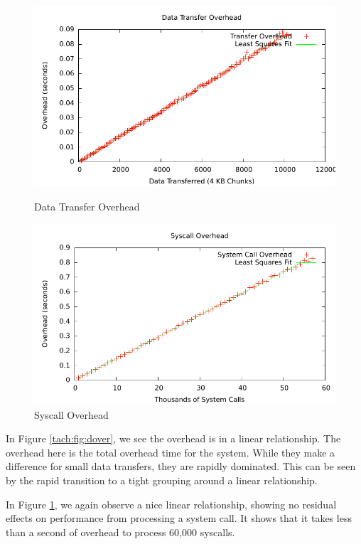 \begin{figure}
\begin{minipage}[b]{0.49\linewidth}
\centering
\includegraphics[scale=0.6, trim=40mm 0mm 20mm  0mm]{tachyon/dataData.pdf}
\caption{Data Transfer Overhead}
\label{tach:fig:dover}
\end{minipage}\begin{minipage}[b]{0.49\linewidth}
\centering
\includegraphics[scale=0.6]{tachyon/sysData.pdf}
\caption{Syscall Overhead}
\label{tach:fig:sover}
\end{minipage}
\end{figure}

In Figure \ref{tach:fig:dover}, we see the overhead is in a linear relationship.
The overhead here is the total overhead
time for the system. While they make a difference for small data transfers, they are
rapidly dominated. This can be seen by the rapid transition to a tight grouping
around a linear relationship.


In Figure \ref{tach:fig:sover}, we again observe a nice linear relationship, showing no residual effects on performance from processing a system call. It shows that it takes less than a second of overhead to process 60,000 syscalls.

